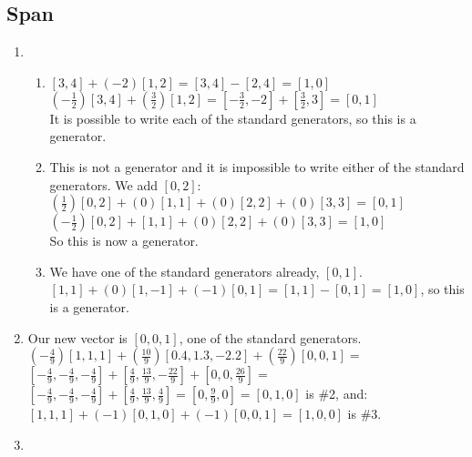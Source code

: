 \documentclass{article}
\begin{document}
    \subsection{Span}
    \begin{enumerate}
        \addtocounter{enumi}{14}
        \item 
            \begin{enumerate}
                \item $[3,4] + (-2)[1,2] = [3,4] - [2,4] = [1,0]$ \\
                    $(-\frac{1}{2})[3,4] + (\frac{3}{2})[1,2] = [-\frac{3}{2},-2] + [\frac{3}{2},3] = [0,1]$ \\
                    It is possible to write each of the standard generators, so this is a generator.
                \item This is not a generator and it is impossible to write either of the standard generators.
                    We add $[0,2]$: \\
                    $(\frac{1}{2})[0,2] + (0)[1,1] + (0)[2,2] + (0)[3,3] = [0,1]$ \\
                    $(-\frac{1}{2})[0,2] + [1,1] + (0)[2,2] + (0)[3,3] = [1,0]$ \\
                    So this is now a generator.
                \item We have one of the standard generators already, $[0,1]$. \\
                    $[1,1] + (0)[1,-1] + (-1)[0,1] = [1,1] - [0,1] = [1,0]$, so this is a generator.
            \end{enumerate}
        \item Our new vector is $[0,0,1]$, one of the standard generators. \bigskip\\
            $(-\frac{4}{9})[1,1,1] + (\frac{10}{9})[0.4,1.3,-2.2] + (\frac{22}{9})[0,0,1] =$  \medskip\\
            $[-\frac{4}{9},-\frac{4}{9},-\frac{4}{9}] + [\frac{4}{9},\frac{13}{9},-\frac{22}{9}] + [0,0,\frac{26}{9}] =$ \medskip\\
            $[-\frac{4}{9},-\frac{4}{9},-\frac{4}{9}] + [\frac{4}{9},\frac{13}{9},\frac{4}{9}] = [0,\frac{9}{9},0] = [0,1,0]$ is \#2, and: \bigskip\\
            $[1,1,1] + (-1)[0,1,0] + (-1)[0,0,1] = [1,0,0]$ is \#3.
        \item 
    \end{enumerate}
    \addtocounter{subsection}{4}
\end{document}
